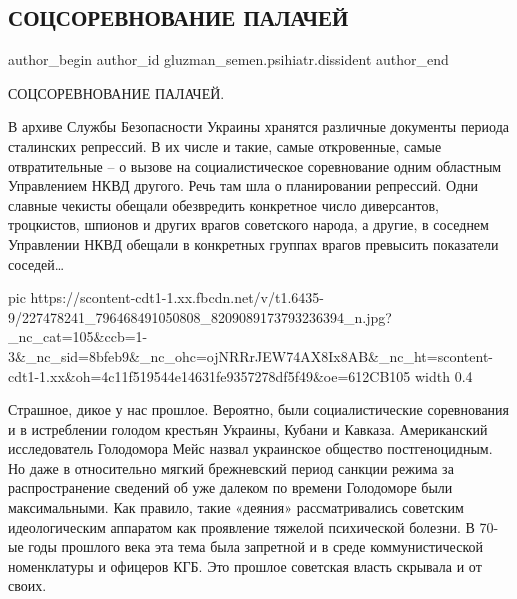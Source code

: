  
 
 
 
 
 
\subsection{СОЦСОРЕВНОВАНИЕ ПАЛАЧЕЙ}
\label{sec:31_07_2021.fb.gluzman_semen.psihiatr.dissident.1.palachi}
 
\ifcmt
 author_begin
   author_id gluzman_semen.psihiatr.dissident
 author_end
\fi

СОЦСОРЕВНОВАНИЕ ПАЛАЧЕЙ.

В архиве Службы Безопасности Украины хранятся различные документы периода
сталинских репрессий. В их числе и такие, самые откровенные, самые
отвратительные – о вызове на социалистическое соревнование одним областным
Управлением НКВД другого. Речь там шла о планировании репрессий. Одни славные
чекисты обещали обезвредить конкретное число диверсантов, троцкистов, шпионов и
других врагов советского народа, а другие, в соседнем Управлении НКВД обещали в
конкретных группах врагов превысить показатели соседей…

\ifcmt
  pic https://scontent-cdt1-1.xx.fbcdn.net/v/t1.6435-9/227478241_796468491050808_8209089173793236394_n.jpg?_nc_cat=105&ccb=1-3&_nc_sid=8bfeb9&_nc_ohc=ojNRRrJEW74AX8Ix8AB&_nc_ht=scontent-cdt1-1.xx&oh=4c11f519544e14631fe9357278df5f49&oe=612CB105
  width 0.4
\fi

Страшное, дикое у нас прошлое. Вероятно, были социалистические соревнования и в
истреблении голодом крестьян Украины, Кубани и Кавказа. Американский
исследователь Голодомора Мейс назвал украинское общество постгеноцидным. Но
даже в относительно мягкий брежневский период санкции режима за распространение
сведений об уже далеком по времени Голодоморе были максимальными. Как правило,
такие «деяния» рассматривались советским идеологическим аппаратом как
проявление тяжелой психической болезни. В 70-ые годы прошлого века эта тема
была запретной и в среде коммунистической номенклатуры и офицеров КГБ. Это
прошлое советская власть скрывала и от своих.

